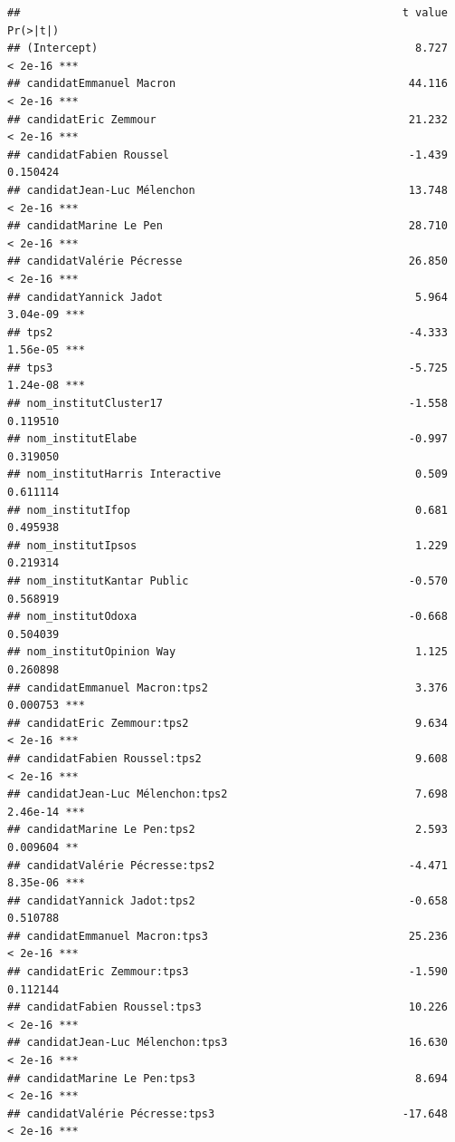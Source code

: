 \documentclass[
]{book}
\begin{document}
\begin{verbatim}
##                                                           t value Pr(>|t|)    
## (Intercept)                                                 8.727  < 2e-16 ***
## candidatEmmanuel Macron                                    44.116  < 2e-16 ***
## candidatEric Zemmour                                       21.232  < 2e-16 ***
## candidatFabien Roussel                                     -1.439 0.150424    
## candidatJean-Luc Mélenchon                                 13.748  < 2e-16 ***
## candidatMarine Le Pen                                      28.710  < 2e-16 ***
## candidatValérie Pécresse                                   26.850  < 2e-16 ***
## candidatYannick Jadot                                       5.964 3.04e-09 ***
## tps2                                                       -4.333 1.56e-05 ***
## tps3                                                       -5.725 1.24e-08 ***
## nom_institutCluster17                                      -1.558 0.119510    
## nom_institutElabe                                          -0.997 0.319050    
## nom_institutHarris Interactive                              0.509 0.611114    
## nom_institutIfop                                            0.681 0.495938    
## nom_institutIpsos                                           1.229 0.219314    
## nom_institutKantar Public                                  -0.570 0.568919    
## nom_institutOdoxa                                          -0.668 0.504039    
## nom_institutOpinion Way                                     1.125 0.260898    
## candidatEmmanuel Macron:tps2                                3.376 0.000753 ***
## candidatEric Zemmour:tps2                                   9.634  < 2e-16 ***
## candidatFabien Roussel:tps2                                 9.608  < 2e-16 ***
## candidatJean-Luc Mélenchon:tps2                             7.698 2.46e-14 ***
## candidatMarine Le Pen:tps2                                  2.593 0.009604 ** 
## candidatValérie Pécresse:tps2                              -4.471 8.35e-06 ***
## candidatYannick Jadot:tps2                                 -0.658 0.510788    
## candidatEmmanuel Macron:tps3                               25.236  < 2e-16 ***
## candidatEric Zemmour:tps3                                  -1.590 0.112144    
## candidatFabien Roussel:tps3                                10.226  < 2e-16 ***
## candidatJean-Luc Mélenchon:tps3                            16.630  < 2e-16 ***
## candidatMarine Le Pen:tps3                                  8.694  < 2e-16 ***
## candidatValérie Pécresse:tps3                             -17.648  < 2e-16 ***

\end{verbatim}
\end{document}
